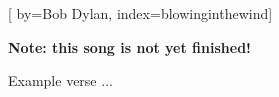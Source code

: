 
[%
    by={Bob Dylan},
    index={blowinginthewind}]


    \label{blowinginthewind}

    \textbf{Note: this song is not yet finished!}

    \beginverse
        Example verse ...
    \endverse
\endsong
